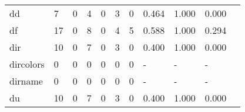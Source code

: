 \begin{longtable}{lp{1.2cm}p{1.2cm}p{1.2cm}p{1.2cm}p{1.2cm}p{1.2cm}p{1.2cm}p{1.2cm}p{1.2cm}p{1.2cm}}
dd        &                                     7 &                                                  0 &                                                4 &                                               0 &                                                3 &                                              0 &                                              0.464 &                                              1.000 &                                              0.000 \\
df        &                                    17 &                                                  0 &                                                8 &                                               0 &                                                4 &                                              5 &                                              0.588 &                                              1.000 &                                              0.294 \\
dir       &                                    10 &                                                  0 &                                                7 &                                               0 &                                                3 &                                              0 &                                              0.400 &                                              1.000 &                                              0.000 \\
dircolors &                                     0 &                                                  0 &                                                0 &                                               0 &                                                0 &                                              0 &                                                  - &                                                  - &                                                  - \\
dirname   &                                     0 &                                                  0 &                                                0 &                                               0 &                                                0 &                                              0 &                                                  - &                                                  - &                                                  - \\
du        &                                    10 &                                                  0 &                                                7 &                                               0 &                                                3 &                                              0 &                                              0.400 &                                              1.000 &                                              0.000 \\

\end{longtable}
